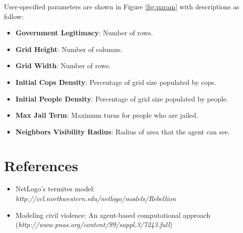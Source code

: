 \documentclass[11pt]{amsart}
\begin{document}
User-specified parameters are shown in Figure \ref{fig:param} with descriptions as follow:

\begin{itemize}
\item \textbf{Government Legitimacy}:  Number of rows.
\item \textbf{Grid Height}:  Number of columns.
\item \textbf{Grid Width}:  Number of rows.
\item \textbf{Initial Cops Density}:  Percentage of grid size populated by cops.
\item \textbf{Initial People Density}:  Percentage of grid size populated by people.
\item \textbf{Max Jail Term}:  Maximum turns for people who are jailed.
\item \textbf{Neighbors Visibility Radius}:  Radius of area that the agent can see.
\end{itemize}
\vspace{.2in}


\section {References}

\begin{itemize}
\item NetLogo's termites model: \emph{http://ccl.northwestern.edu/netlogo/models/Rebellion}
\item Modeling civil violence: An agent-based computational approach (\emph{http://www.pnas.org/content/99/suppl.3/7243.full})
\end{itemize}
\end{document}
